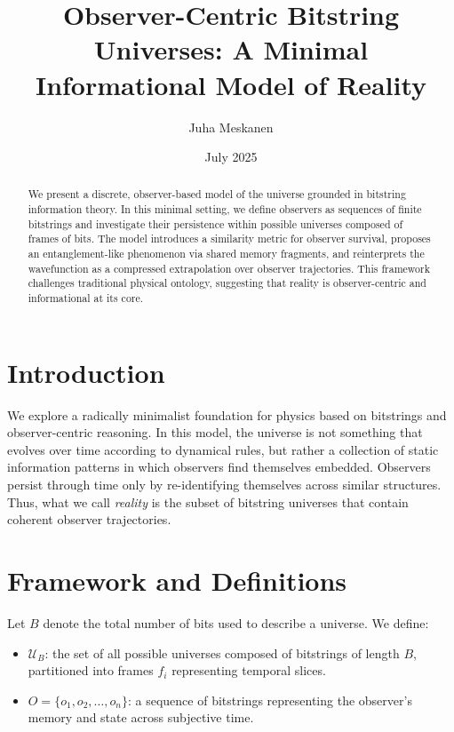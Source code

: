\documentclass[12pt]{article}
\title{Observer-Centric Bitstring Universes: A Minimal Informational Model of Reality}
\author{Juha Meskanen}
\date{July 2025}
\begin{document}
\maketitle

\begin{abstract}
    We present a discrete, observer-based model of the universe grounded in bitstring information theory. In this minimal setting, we define observers as sequences of finite bitstrings and investigate their persistence within possible universes composed of frames of bits. The model introduces a similarity metric for observer survival, proposes an entanglement-like phenomenon via shared memory fragments, and reinterprets the wavefunction as a compressed extrapolation over observer trajectories. This framework challenges traditional physical ontology, suggesting that reality is observer-centric and informational at its core.
\end{abstract}

\section{Introduction}

We explore a radically minimalist foundation for physics based on bitstrings and observer-centric reasoning. In this model, the universe is not something that evolves over time according to dynamical rules, but rather a collection of static information patterns in which observers find themselves embedded. Observers persist through time only by re-identifying themselves across similar structures. Thus, what we call \emph{reality} is the subset of bitstring universes that contain coherent observer trajectories.

\section{Framework and Definitions}

Let $B$ denote the total number of bits used to describe a universe. We define:

\begin{itemize}
    \item $\mathcal{U}_B$: the set of all possible universes composed of bitstrings of length $B$, partitioned into frames $f_i$ representing temporal slices.
    \item $O = \{o_1, o_2, \ldots, o_n\}$: a sequence of bitstrings representing the observer's memory and state across subjective time.
\end{itemize}
\end{document}
